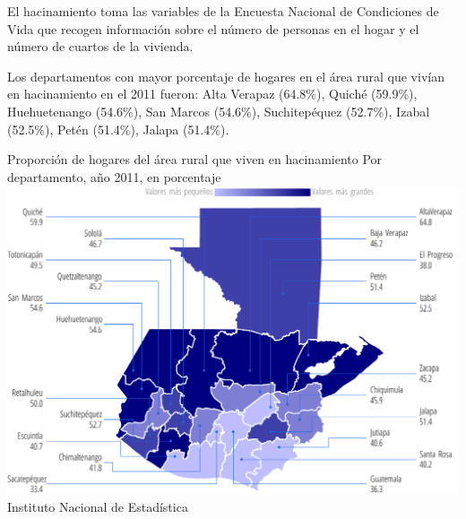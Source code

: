         {%
        El hacinamiento toma las variables de la Encuesta Nacional de Condiciones de Vida que recogen información sobre el número de personas en el hogar y el número de cuartos de la vivienda.
        
        Los departamentos con mayor porcentaje de hogares en el área rural que vivían en hacinamiento en el 2011 fueron: Alta Verapaz (64.8\%), Quiché (59.9\%), Huehuetenango (54.6\%), San Marcos (54.6\%), Suchitepéquez (52.7\%), Izabal (52.5\%), Petén (51.4\%), Jalapa (51.4\%). }%
        {%
        Proporción de hogares del área rural que viven en hacinamiento
        } %
        {%
        	Por departamento, año 2011, en porcentaje} %
        {%
        	\includegraphics[width=52\cuadri]{graficas/1_13.pdf}}%
        {%
        	Instituto Nacional de Estadística} %
        
        
          
          
